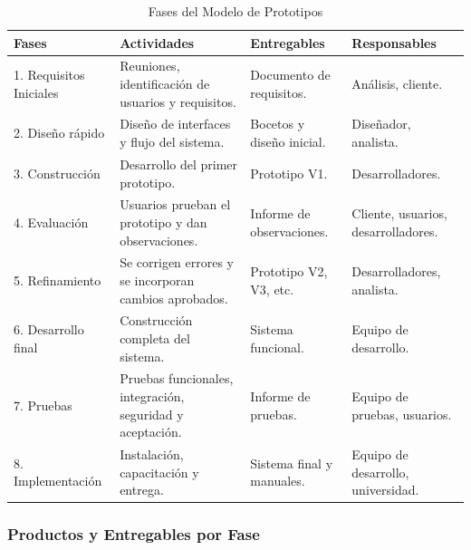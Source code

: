 \documentclass[pdflatex,sn-mathphys-num]{sn-jnl}%
\theoremstyle{thmstyleone}%
\theoremstyle{thmstyletwo}%
\theoremstyle{thmstylethree}%
\begin{document}
 \begin{table}[htbp]
 	\centering
 	\caption{Fases del Modelo de Prototipos}
 	\label{tab:fases_prototipos}
 	\begin{tabular}{|p{3cm}|p{4cm}|p{4cm}|p{3cm}|}
 		\hline
 		\textbf{Fases} & \textbf{Actividades} & \textbf{Entregables} & \textbf{Responsables} \\ \hline
 		
 		1. Requisitos Iniciales &
 		Reuniones, identificación de usuarios y requisitos. &
 		Documento de requisitos. &
 		Análisis, cliente. \\ \hline
 		
 		2. Diseño rápido &
 		Diseño de interfaces y flujo del sistema. &
 		Bocetos y diseño inicial. &
 		Diseñador, analista. \\ \hline
 		
 		3. Construcción &
 		Desarrollo del primer prototipo. &
 		Prototipo V1. &
 		Desarrolladores. \\ \hline
 		
 		4. Evaluación &
 		Usuarios prueban el prototipo y dan observaciones. &
 		Informe de observaciones. &
 		Cliente, usuarios, desarrolladores. \\ \hline
 		
 		5. Refinamiento &
 		Se corrigen errores y se incorporan cambios aprobados. &
 		Prototipo V2, V3, etc. &
 		Desarrolladores, analista. \\ \hline
 		
 		6. Desarrollo final &
 		Construcción completa del sistema. &
 		Sistema funcional. &
 		Equipo de desarrollo. \\ \hline
 		
 		7. Pruebas &
 		Pruebas funcionales, integración, seguridad y aceptación. &
 		Informe de pruebas. &
 		Equipo de pruebas, usuarios. \\ \hline
 		
 		8. Implementación &
 		Instalación, capacitación y entrega. &
 		Sistema final y manuales. &
 		Equipo de desarrollo, universidad. \\ \hline
 		
 	\end{tabular}
 \end{table}
 
 \subsubsection{Productos y Entregables por Fase}
 
\end{document}
